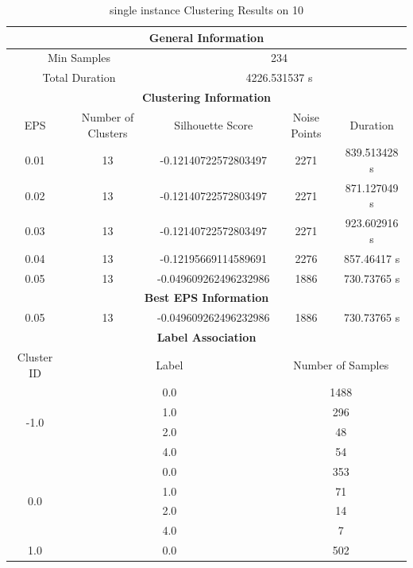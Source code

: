 \begin{longtable}{|c|c|c|c|c|}
\caption{single instance Clustering Results on 10} \label{tab:10_single_instance_clustering_results}\\
\hline
\multicolumn{5}{|c|}{\textbf{General Information}} \\
\hline
\multicolumn{2}{|c|}{Min Samples} & \multicolumn{3}{c|}{234} \\
\multicolumn{2}{|c|}{Total Duration} & \multicolumn{3}{c|}{4226.531537 s} \\
\hline
\multicolumn{5}{|c|}{\textbf{Clustering Information}} \\
\hline
EPS & Number of Clusters & Silhouette Score & Noise Points & Duration \\
0.01 & 13 & -0.12140722572803497 & 2271 & 839.513428 s\\
0.02 & 13 & -0.12140722572803497 & 2271 & 871.127049 s\\
0.03 & 13 & -0.12140722572803497 & 2271 & 923.602916 s\\
0.04 & 13 & -0.12195669114589691 & 2276 & 857.46417 s\\
0.05 & 13 & -0.049609262496232986 & 1886 & 730.73765 s\\
\hline
\multicolumn{5}{|c|}{\textbf{Best EPS Information}} \\
\hline
0.05 & 13 & -0.049609262496232986 & 1886 & 730.73765 s\\
\hline
\multicolumn{5}{|c|}{\textbf{Label Association}} \\
\hline
Cluster ID & \multicolumn{2}{c|}{Label} & \multicolumn{2}{c|}{Number of Samples} \\
\hline
\multirow{4}{*}{-1.0} & \multicolumn{2}{c|}{0.0} & \multicolumn{2}{c|}{1488} \\
& \multicolumn{2}{c|}{1.0} & \multicolumn{2}{c|}{296} \\
& \multicolumn{2}{c|}{2.0} & \multicolumn{2}{c|}{48} \\
& \multicolumn{2}{c|}{4.0} & \multicolumn{2}{c|}{54} \\
\hline
\multirow{4}{*}{0.0} & \multicolumn{2}{c|}{0.0} & \multicolumn{2}{c|}{353} \\
& \multicolumn{2}{c|}{1.0} & \multicolumn{2}{c|}{71} \\
& \multicolumn{2}{c|}{2.0} & \multicolumn{2}{c|}{14} \\
& \multicolumn{2}{c|}{4.0} & \multicolumn{2}{c|}{7} \\
\hline
\multirow{4}{*}{1.0} & \multicolumn{2}{c|}{0.0} & \multicolumn{2}{c|}{502} \\

\end{longtable}
